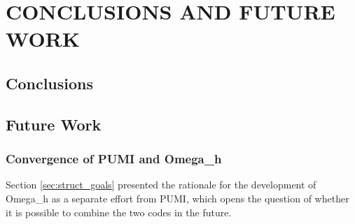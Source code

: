 
\chapter{CONCLUSIONS AND FUTURE WORK}

\section{Conclusions}

\section{Future Work}

\subsection{Convergence of PUMI and Omega\_h}

Section \ref{sec:struct_goals} presented the rationale
for the development of Omega\_h as a separate effort from PUMI,
which opens the question of whether it is possible
to combine the two codes in the future.

